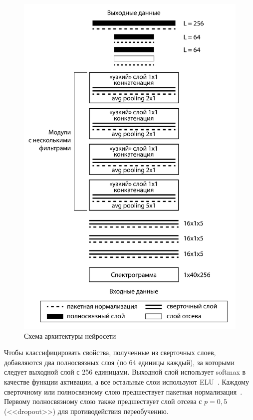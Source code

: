 \begin{figure}[h]
	\centering
	\includegraphics[scale=0.38]{svg/cnn.pdf}
	\caption{Схема архитектуры нейросети}
	\label{img:cnn}
\end{figure}

\newpage

Чтобы классифицировать свойства, полученные из сверточных слоев, добавляются два полносвязных слоя (по 64 единицы каждый), за которыми следует выходной слой с 256 единицами. Выходной слой использует softmax в качестве функции активации, а все остальные слои используют ELU~\cite{elu}. Каждому сверточному или полносвязному слою предшествует пакетная нормализация~\cite{batch}. Первому полносвязному слою также предшествует слой отсева с $p = 0,5$ (<<dropout>>) для противодействия переобучению.

